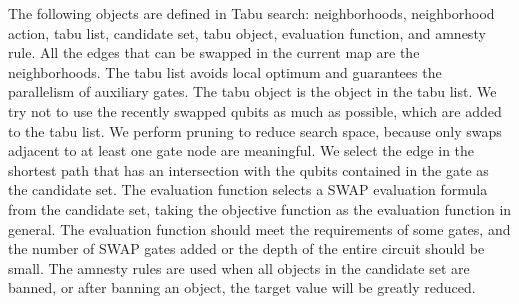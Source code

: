 \documentclass[journal]{IEEEtran}
\begin{document}
The following objects are defined in Tabu search: neighborhoods, neighborhood action, tabu list, candidate set, tabu object, evaluation function, and amnesty rule. All the edges that can be swapped in the current map are the neighborhoods. The tabu list avoids local optimum and guarantees the parallelism of auxiliary gates. The tabu object is the object in the tabu list. We try not to use the recently swapped qubits as much as possible, which are added to the tabu list. We perform pruning to reduce search space, because only swaps adjacent to at least one gate node are meaningful. We select the edge in the shortest path that has an intersection with the qubits contained in the gate as the candidate set. The evaluation function selects a SWAP evaluation formula from the candidate set, 
 taking the objective function as the evaluation function in general. The evaluation function should meet the requirements of some gates, 
and the number of SWAP gates added or the depth of the entire circuit should be small. The amnesty rules are used when all objects in the candidate set are banned,  or after banning an object, the target value will be greatly reduced.
\end{document}
